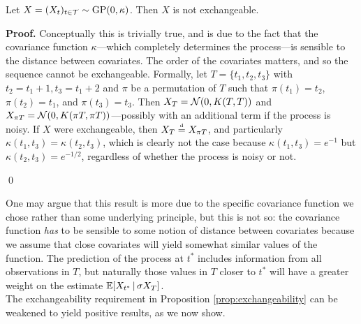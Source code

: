 \begin{proposition} \label{prop:exchangeability}
	Let $X = (X_t)_{t \in \mathcal{T}} \sim \mathrm{GP} (0, \kappa)$. Then $X$ is not exchangeable.
\end{proposition}

\textbf{Proof. \hspace{0.05cm}} Conceptually this is trivially true, and is due to the fact that the covariance function $\kappa$---which completely determines the process---is sensible to the distance between covariates. The order of the covariates matters, and so the sequence cannot be exchangeable. Formally, let $T = \{ t_1, t_2, t_3 \}$ with $t_2 = t_1 + 1, t_3 = t_1 + 2$ and $\pi$ be a permutation of $T$ such that $\pi(t_1) = t_2$,  $\pi(t_2) = t_1$, and $\pi(t_3) = t_3$. Then $X_T = \mathcal{N} (0, K(T, T))$ and $X_{\pi T} = \mathcal{N}(0, K(\pi T, \pi T))$---possibly with an additional term if the process is noisy. If $X$ were exchangeable, then $X_T \stackrel{\text{\rm\tiny d}}{=} X_{\pi T}$, and particularly $\kappa(t_1, t_3) = \kappa(t_2, t_3)$, which is clearly not the case because $\kappa(t_1, t_3) = e^{-1}$ but $\kappa(t_2, t_3) = e^{-1/2}$, regardless of whether the process is noisy or not.

\qed

\vskip 0.2cm

One may argue that this result is more due to the specific covariance function we chose rather than some underlying principle, but this is not so: the covariance function \textit{has} to be sensible to some notion of distance between covariates because we assume that close covariates will yield somewhat similar values of the function. The prediction of the process at $t^{*}$ includes information from all observations in $T$, but naturally those values in $T$ closer to $t^{*}$ will have a greater weight on the estimate $\mathbb{E} [X_{t^{*}} \, | \, \sigma X_T ]$. \\


The exchangeability requirement in Proposition \ref{prop:exchangeability} can be weakened to yield positive results, as we now show.



